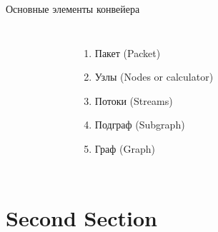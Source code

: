 \documentclass[aspectratio=169,xcolor=dvipsnames]{beamer}
\begin{document}
\begin{frame}{Основные элементы конвейера}
    \begin{columns}[c] %

        \begin{figure}[h]
            \label{ris:subgraph}
        \end{figure}

        \begin{enumerate}
            \item Пакет (Packet)
            \item Узлы (Nodes or calculator)
            \item Потоки (Streams)
            \item Подграф (Subgraph)
            \item Граф (Graph)
        \end{enumerate}

    \end{columns}
\end{frame}

\section{Second Section}
\end{document}
